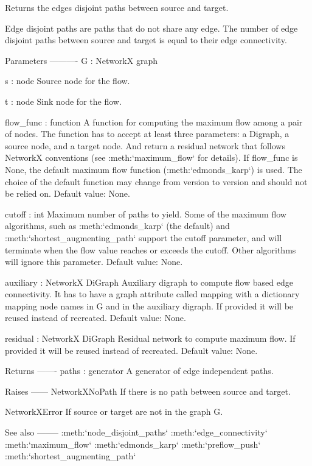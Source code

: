 \begin{DoxyVerb}Returns the edges disjoint paths between source and target.

Edge disjoint paths are paths that do not share any edge. The
number of edge disjoint paths between source and target is equal
to their edge connectivity.

Parameters
----------
G : NetworkX graph

s : node
    Source node for the flow.

t : node
    Sink node for the flow.

flow_func : function
    A function for computing the maximum flow among a pair of nodes.
    The function has to accept at least three parameters: a Digraph,
    a source node, and a target node. And return a residual network
    that follows NetworkX conventions (see :meth:`maximum_flow` for
    details). If flow_func is None, the default maximum flow function
    (:meth:`edmonds_karp`) is used. The choice of the default function
    may change from version to version and should not be relied on.
    Default value: None.

cutoff : int
    Maximum number of paths to yield. Some of the maximum flow
    algorithms, such as :meth:`edmonds_karp` (the default) and
    :meth:`shortest_augmenting_path` support the cutoff parameter,
    and will terminate when the flow value reaches or exceeds the
    cutoff. Other algorithms will ignore this parameter.
    Default value: None.

auxiliary : NetworkX DiGraph
    Auxiliary digraph to compute flow based edge connectivity. It has
    to have a graph attribute called mapping with a dictionary mapping
    node names in G and in the auxiliary digraph. If provided
    it will be reused instead of recreated. Default value: None.

residual : NetworkX DiGraph
    Residual network to compute maximum flow. If provided it will be
    reused instead of recreated. Default value: None.

Returns
-------
paths : generator
    A generator of edge independent paths.

Raises
------
NetworkXNoPath
    If there is no path between source and target.

NetworkXError
    If source or target are not in the graph G.

See also
--------
:meth:`node_disjoint_paths`
:meth:`edge_connectivity`
:meth:`maximum_flow`
:meth:`edmonds_karp`
:meth:`preflow_push`
:meth:`shortest_augmenting_path`


\end{DoxyVerb}
